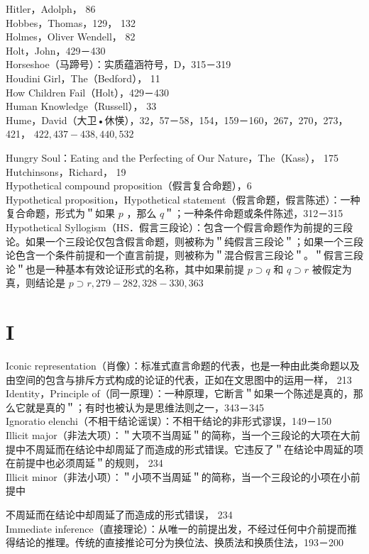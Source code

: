 Hitler，Adolph， 86\\
Hobbes，Thomas，129， 132\\
Holmes，Oliver Wendell， 82\\
Holt，John，429－430\\
Horseshoe（马蹄号）：实质蕴涵符号，D，315－319\\
Houdini Girl，The（Bedford）， 11\\
How Children Fail（Holt），429－430\\
Human Knowledge（Russell）， 33\\
Hume，David（大卫•休愥），32，57－58，154，159－160，267，270，273，421， $422,437-438,440,532$

Hungry Soul：Eating and the Perfecting of Our Nature，The（Kass）， 175\\
Hutchinsons，Richard， 19\\
Hypothetical compound proposition（假言复合命题），6\\
Hypothetical proposition，Hypothetical statement（假言命题，假言陈述）：一种复合命题，形式为＂如果 $p$ ，那么 $q$＂；一种条件命题或条件陈述，312－315\\
Hypothetical Syllogism（HS．假言三段论）：包含一个假言命题作为前提的三段论。如果一个三段论仅包含假言命题，则被称为＂纯假言三段论＂；如果一个三段论色含一个条件前提和一个直言前提，则被称为＂混合假言三段论＂。＂假言三段论＂也是一种基本有效论证形式的名称，其中如果前提 $p \supset q$ 和 $q \supset r$ 被假定为真，则结论是 $p \supset r, 279-282,328-330,363$

\section*{I}
Iconic representation（肖像）：标准式直言命题的代表，也是一种由此类命题以及由空间的包含与排斥方式构成的论证的代表，正如在文思图中的运用一样， 213\\
Identity，Principle of（同一原理）：一种原理，它断言＂如果一个陈述是真的，那么它就是真的＂；有时也被认为是思维法则之一，343－345\\
Ignoratio elenchi（不相干结论谣误）：不相干结论的非形式谬误，149－150\\
Illicit major（非法大项）：＂大项不当周延＂的简称，当一个三段论的大项在大前提中不周延而在结论中却周延了而造成的形式错误。它违反了＂在结论中周延的项在前提中也必须周延＂的规则， 234\\
Illicit minor（非法小项）：＂小项不当周延＂的简称，当一个三段论的小项在小前提中

不周延而在结论中却周延了而造成的形式错误， 234\\
Immediate inference（直接理论）：从唯一的前提出发，不经过任何中介前提而推得结论的推理。传统的直接推论可分为换位法、换质法和换质住法，193－200

